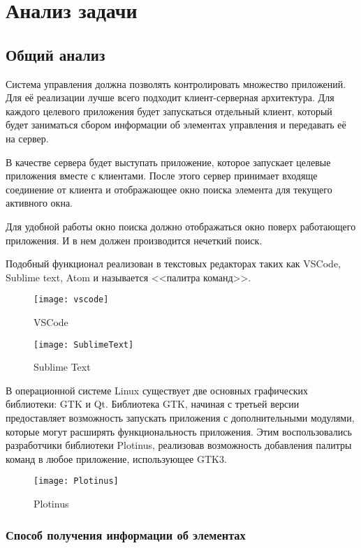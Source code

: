 \chapter{Анализ задачи}

\section{Общий анализ}

Система управления должна позволять контролировать множество приложений. Для её
реализации лучше всего подходит клиент-серверная архитектура. Для каждого
целевого приложения будет запускаться отдельный клиент, который будет заниматься
сбором информации об элементах управления и передавать её на сервер.

В качестве сервера будет выступать приложение, которое запускает целевые
приложения вместе с клиентами. После этого сервер принимает входяще соединение
от клиента и отображающее окно поиска элемента для текущего активного окна.

Для удобной работы окно поиска должно отображаться окно поверх работающего
приложения. И в нем должен производится нечеткий поиск.

Подобный функционал реализован в текстовых редакторах таких как VSCode, Sublime
text, Atom и называется <<палитра команд>>.

\begin{figure}
	\texttt{[image: vscode]}
	\caption{VSCode}
\end{figure}

\begin{figure}
	\texttt{[image: SublimeText]}
	\caption{Sublime Text}
\end{figure}

В операционной системе Linux существует две основных графических библиотеки: GTK
и Qt. Библиотека GTK, начиная с третьей версии предоставляет возможность
запускать приложения с дополнительными модулями, которые могут расширять
функциональность приложения. Этим воспользовались разработчики библиотеки
Plotinus, реализовав возможность добавления палитры команд в любое приложение,
использующее GTK3.

\begin{figure}
	\texttt{[image: Plotinus]}
	\caption{Plotinus}
\end{figure}

\subsection{Способ получения информации об элементах}

